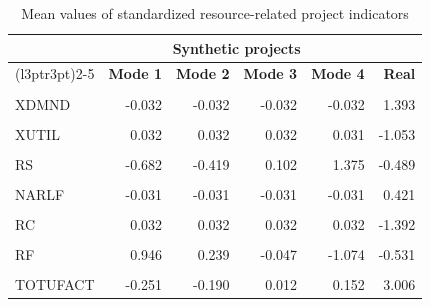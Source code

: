 \documentclass[preprint,
3p]{elsarticle} %
\begin{document}
\begin{table}[H]
\centering\centering
\caption{\label{tab:MEANS_RESOURCE}Mean values of standardized resource-related project indicators}
\centering
\fontsize{8}{10}\selectfont
\begin{tabular}[t]{lrrrrr}
\toprule
\multicolumn{1}{c}{ } & \multicolumn{4}{c}{Synthetic projects} & \multicolumn{1}{c}{ } \\
\cmidrule(l{3pt}r{3pt}){2-5}
\textbf{ } & \textbf{Mode 1} & \textbf{Mode 2} & \textbf{Mode 3} & \textbf{Mode 4} & \textbf{Real}\\
\midrule
\cellcolor{gray!10}{NRES} & \cellcolor{gray!10}{-0.049} & \cellcolor{gray!10}{-0.049} & \cellcolor{gray!10}{-0.049} & \cellcolor{gray!10}{-0.049} & \cellcolor{gray!10}{0.660}\\
XDMND & -0.032 & -0.032 & -0.032 & -0.032 & 1.393\\
\cellcolor{gray!10}{RU} & \cellcolor{gray!10}{0.801} & \cellcolor{gray!10}{0.069} & \cellcolor{gray!10}{-0.141} & \cellcolor{gray!10}{-0.782} & \cellcolor{gray!10}{0.435}\\
XUTIL & 0.032 & 0.032 & 0.032 & 0.031 & -1.053\\
\cellcolor{gray!10}{PCTR} & \cellcolor{gray!10}{1.116} & \cellcolor{gray!10}{0.067} & \cellcolor{gray!10}{-0.017} & \cellcolor{gray!10}{-1.039} & \cellcolor{gray!10}{-1.047}\\
\addlinespace
RS & -0.682 & -0.419 & 0.102 & 1.375 & -0.489\\
\cellcolor{gray!10}{A\_RS} & \cellcolor{gray!10}{0.315} & \cellcolor{gray!10}{-0.028} & \cellcolor{gray!10}{0.162} & \cellcolor{gray!10}{-0.219} & \cellcolor{gray!10}{-0.778}\\
NARLF & -0.031 & -0.031 & -0.031 & -0.031 & 0.421\\
\cellcolor{gray!10}{GINI} & \cellcolor{gray!10}{-1.339} & \cellcolor{gray!10}{-0.180} & \cellcolor{gray!10}{0.285} & \cellcolor{gray!10}{1.238} & \cellcolor{gray!10}{-0.040}\\
RC & 0.032 & 0.032 & 0.032 & 0.032 & -1.392\\
\addlinespace
\cellcolor{gray!10}{XCON} & \cellcolor{gray!10}{0.032} & \cellcolor{gray!10}{0.032} & \cellcolor{gray!10}{0.032} & \cellcolor{gray!10}{0.032} & \cellcolor{gray!10}{-1.392}\\
RF & 0.946 & 0.239 & -0.047 & -1.074 & -0.531\\
\cellcolor{gray!10}{TOTOFACT} & \cellcolor{gray!10}{-0.024} & \cellcolor{gray!10}{-0.011} & \cellcolor{gray!10}{-0.066} & \cellcolor{gray!10}{-0.070} & \cellcolor{gray!10}{1.869}\\
TOTUFACT & -0.251 & -0.190 & 0.012 & 0.152 & 3.006\\
\bottomrule
\end{tabular}
\end{table}
\end{document}
